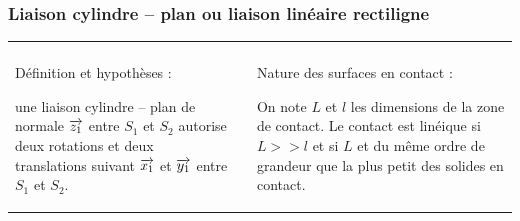 \documentclass[10pt,oneside]{article}
\begin{document}
\subsubsection{Liaison cylindre -- plan ou liaison linéaire rectiligne}
\begin{center}
\begin{tabular}{p{} c p{}}
\hline
& &\\
Définition et hypothèses : 

une liaison cylindre -- plan de normale $\overrightarrow{z_1}$ entre $S_1$ et $S_2$ autorise deux rotations et deux translations suivant $\overrightarrow{x_1}$ et $\overrightarrow{y_1}$ entre $S_1$ et $S_2$. 
&& Nature des surfaces en contact :

On note $L$ et $l$ les dimensions de la zone de contact. Le contact est linéique si $L >> l$ et si $L$ et du même ordre de grandeur que la plus petit des solides en contact.


\end{tabular}
\end{center}
\end{document}
